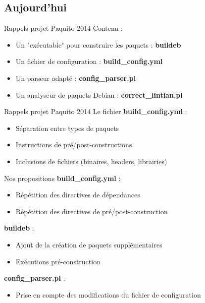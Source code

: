 \documentclass[11pt,xcolor=dvipsnames]{beamer}
\begin{document}
\subsection{Aujourd'hui}
\begin{frame}{Rappels projet Paquito 2014}
	Contenu :
	\begin{itemize}
		\item Un "exécutable" pour construire les paquets : \textbf{buildeb}
		\item Un fichier de configuration : \textbf{build\_config.yml}
		\item Un parseur adapté : \textbf{config\_parser.pl}
		\item Un analyseur de paquets Debian : \textbf{correct\_lintian.pl}
	\end{itemize}
\end{frame}

\begin{frame}{Rappels projet Paquito 2014}
	Le fichier \textbf{build\_config.yml} :
	\begin{itemize}
		\item Séparation entre types de paquets
		\item Instructions de pré/post-constructions
		\item Inclusions de fichiers (binaires, headers, librairies)
	\end{itemize}
\end{frame}

\begin{frame}{Nos propositions}
	\textbf{build\_config.yml} :
	\begin{itemize}
		\item Répétition des directives de dépendances
		\item Répétition des directives de pré/post-construction
	\end{itemize}
	\textbf{buildeb} :
	\begin{itemize}
		\item Ajout de la création de paquets supplémentaires
		\item Exécutions pré-construction
	\end{itemize}
	\textbf{config\_parser.pl} :
	\begin{itemize}
		\item Prise en compte des modifications du fichier de configuration
	\end{itemize}
\end{frame}
\end{document}
